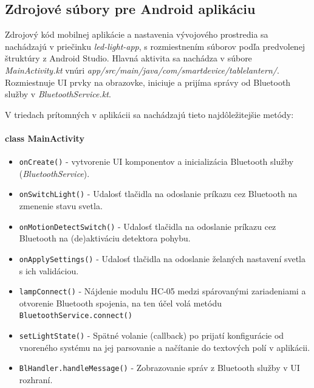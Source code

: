 \documentclass[12pt, a4paper]{article}
\begin{document}
\subsection{Zdrojové súbory pre Android aplikáciu}
Zdrojový kód mobilnej aplikácie a nastavenia vývojového prostredia sa nachádzajú v priečinku \emph{led-light-app}, s rozmiestnením súborov podľa predvolenej štruktúry z Android Studio. Hlavná aktivita sa nachádza v súbore \emph{MainActivity.kt} vnúri \emph{app/src/main/java/com/smartdevice/tablelantern/}. Rozmiestnuje UI prvky na obrazovke,
iniciuje a prijíma správy od Bluetooth služby v \emph{BluetoothService.kt}.

V triedach prítomných v aplikácii sa nachádzajú tieto najdôležitejšie metódy:
\paragraph{class MainActivity}
\begin{itemize}
\itemsep0pt
\item \verb|onCreate()| - vytvorenie UI komponentov a inicializácia Bluetooth služby (\emph{BluetoothService}).
\item \verb|onSwitchLight()| - Udalosť tlačidla na odoslanie príkazu cez Bluetooth na zmenenie stavu svetla.
\item \verb|onMotionDetectSwitch()| -  Udalosť tlačidla na odoslanie príkazu cez Bluetooth na (de)aktiváciu detektora pohybu.
\item \verb|onApplySettings()| - Udalosť tlačidla na odoslanie želaných nastavení svetla s ich validáciou.
\item \verb|lampConnect()| - Nájdenie modulu HC-05 medzi spárovanými zariadeniami a otvorenie Bluetooth spojenia, na ten účel volá metódu \verb|BluetoothService.connect()|
\item \verb|setLightState()| - Spätné volanie (callback) po prijatí konfigurácie od vnoreného systému na jej parsovanie a načítanie do textových polí v aplikácii.
\item \verb|BlHandler.handleMessage()| - Zobrazovanie správ z Bluetooth služby v UI rozhraní.
\end{itemize}
\end{document}
